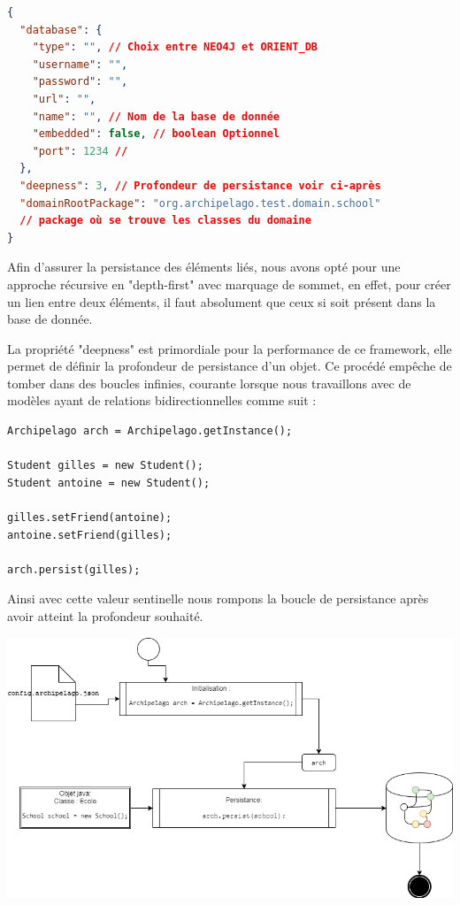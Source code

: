 \documentclass[a4paper,fleqn,12pt]{report}
\begin{document}
\begin{lstlisting}[language=json]
{
  "database": {
    "type": "", // Choix entre NEO4J et ORIENT_DB
    "username": "",
    "password": "",
    "url": "",
    "name": "", // Nom de la base de donnée
    "embedded": false, // boolean Optionnel
    "port": 1234 // 
  },
  "deepness": 3, // Profondeur de persistance voir ci-après
  "domainRootPackage": "org.archipelago.test.domain.school" 
  // package où se trouve les classes du domaine 
}
\end{lstlisting}
Afin d'assurer la persistance des éléments liés, nous avons opté pour une approche récursive en "depth-first" avec marquage de sommet, en effet, pour créer un lien entre deux éléments, il faut absolument que ceux si soit présent dans la base de donnée.

La propriété "deepness" est primordiale pour la performance de ce framework, elle permet de définir la profondeur de persistance d'un objet. Ce procédé empêche de tomber dans des boucles infinies, courante lorsque nous travaillons avec de modèles ayant de relations bidirectionnelles comme suit : 

\begin{lstlisting}
Archipelago arch = Archipelago.getInstance();

Student gilles = new Student();
Student antoine = new Student();

gilles.setFriend(antoine);
antoine.setFriend(gilles);

arch.persist(gilles);
\end{lstlisting}

Ainsi avec cette valeur sentinelle nous rompons la boucle de persistance après avoir atteint la profondeur souhaité.

\begin{center}
\includegraphics[scale=0.5]{figures/Persist.png}
\label{fig:Persist}
\end{center}
    
\end{document}
